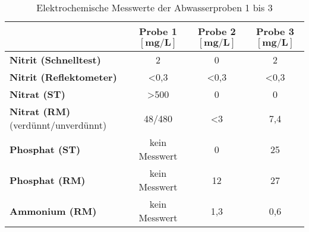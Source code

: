 \vspace*{-2.5mm}
\renewcommand{\arraystretch}{1.2}
\begin{table}[h!]
	\centering
	\caption{Elektrochemische Messwerte der Abwasserproben 1 bis 3}
	\label{tab:fotometrisch}
	\begin{tabulary}{1.2\textwidth}{L|C|C|C}
		\hline
		\textbf{} 						& \textbf{Probe 1} $\boldsymbol{\left[\si{\milli \gram \per \liter}\right]}$& \textbf{Probe 2}$\boldsymbol{\left[\si{\milli \gram \per \liter}\right]}$&\textbf{Probe 3}$\boldsymbol{\left[\si{\milli \gram \per \liter}\right]}$\\
		\hline
		\textbf{Nitrit  (Schnelltest)}	& 2	& 0&2\\
		\textbf{Nitrit  (Reflektometer)} & <0,3  & <0,3	&<0,3\\
		\hline
		\textbf{Nitrat  (ST)}			& >500 	& 0	&0\\
		\textbf{Nitrat  (RM)}	{\footnotesize (verdünnt/unverdünnt)}		& 48/480	& <3	&7,4\\
		\hline
		\textbf{Phosphat  (ST)}		& {\footnotesize kein Messwert}\protect\footnotemark[2]	& 0	&25\\
		\textbf{Phosphat  (RM)}		& {\footnotesize kein Messwert}\protect\footnotemark[2]	& 12	&27\\
		\hline
		\textbf{Ammonium  (RM)}		& {\footnotesize kein Messwert}\protect\footnotemark[2]		&	1,3	&0,6\\
		\hline
	\end{tabulary}
\end{table}
\FloatBarrier
\vspace*{-2.5mm}



